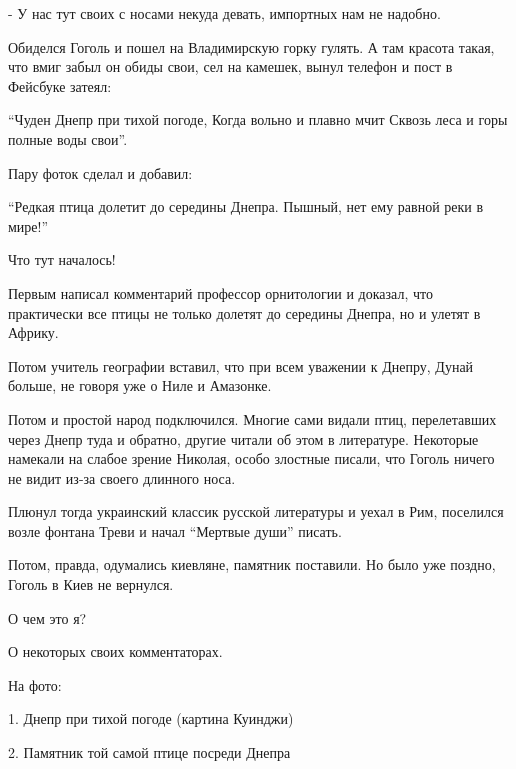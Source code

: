  - У нас тут своих с носами некуда девать, импортных нам не надобно.

Обиделся Гоголь и пошел на Владимирскую горку гулять. А там красота такая, что
вмиг забыл он обиды свои, сел на камешек, вынул телефон и пост в Фейсбуке
затеял:

\begin{zznagolos}
\enquote{Чуден Днепр при тихой погоде, 
Когда вольно и плавно мчит
Сквозь леса и горы полные воды свои}.
\end{zznagolos}

Пару фоток сделал и добавил:

\begin{zznagolos}
\enquote{Редкая птица долетит до середины Днепра.
Пышный, нет ему равной реки в мире!}
\end{zznagolos}

Что тут началось! 

Первым написал комментарий профессор орнитологии и доказал, что практически все
птицы не только долетят до середины Днепра, но и улетят в Африку.

\begin{multicols}{2}
\setlength{\parindent}{0pt}


\end{multicols}

Потом учитель географии вставил, что при всем уважении к Днепру, Дунай больше,
не говоря уже о Ниле и Амазонке.

Потом и простой народ подключился. Многие сами видали птиц, перелетавших через
Днепр туда и обратно, другие читали об этом в литературе. Некоторые намекали на
слабое зрение Николая, особо злостные писали, что Гоголь ничего не видит из-за
своего длинного носа.

Плюнул тогда украинский классик русской литературы и уехал в Рим, поселился
возле фонтана Треви и начал \enquote{Мертвые души} писать. 

Потом, правда, одумались киевляне, памятник поставили. Но было уже поздно,
Гоголь в Киев не вернулся.

О чем это я? 

О некоторых своих комментаторах.

На фото:

1. Днепр при тихой погоде (картина Куинджи)

2. Памятник той самой птице посреди Днепра

